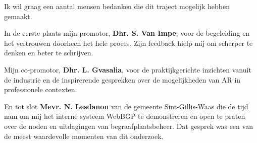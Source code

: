 Ik wil graag een aantal mensen bedanken die dit traject mogelijk hebben gemaakt.

In de eerste plaats mijn promotor, \textbf{Dhr. S. Van Impe}, voor de begeleiding
en het vertrouwen doorheen het hele proces. Zijn feedback hielp mij om scherper
te denken en beter te schrijven.

Mijn co-promotor, \textbf{Dhr. L. Gvasalia}, voor de praktijkgerichte inzichten
vanuit de industrie en de inspirerende gesprekken over de mogelijkheden van AR in
professionele contexten.

En tot slot \textbf{Mevr. N. Lesdanon} van de gemeente Sint-Gillis-Waas die de tijd nam om mij
het interne systeem WebBGP te demonstreren en open te praten over de noden en
uitdagingen van begraafplaatsbeheer. Dat gesprek was een van de meest waardevolle
momenten van dit onderzoek.
